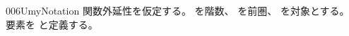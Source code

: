 \documentclass[index]{subfiles}
\begin{document}
\begin{myBlock}{006U}{myNotation}
  関数外延性を仮定する。
  を階数、
  を前圏、
  を対象とする。
  要素を
  と定義する。
\end{myBlock}
\end{document}
